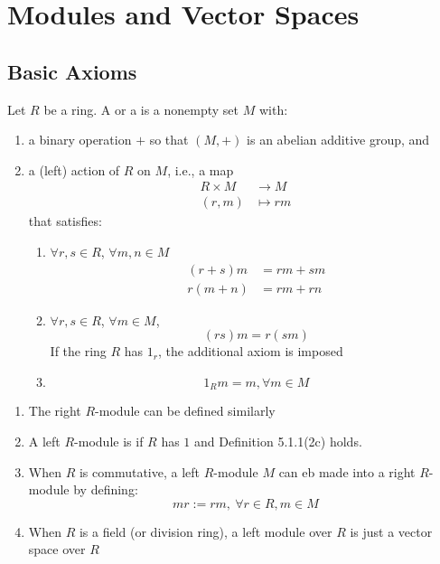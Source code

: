 \section{Modules and Vector Spaces}
\label{sect:modandvec}

\subsection{Basic Axioms}

\begin{definition}
Let $R$ be a ring. A  or a  is a nonempty set $M$ with:
\begin{enumerate}[label=(\roman*)]
\item a binary operation $+$ so that $(M, +)$ is an abelian additive group, and
\item a (left) action of $R$ on $M$, i.e., a map
\begin{align}
R \times M &\rightarrow M \nonumber \\
(r, m) &\mapsto rm \nonumber
\end{align}
that satisfies:
\begin{enumerate}[label=\alph*.]
\item {} $\forall r,s \in R$, $\forall m,n \in M$
\begin{align}
(r+s)m &= rm + sm \nonumber \\
r(m+n) &= rm + rn \nonumber
\end{align}
\item {} $\forall r,s \in R$, $\forall m \in M$,
\begin{equation}
(rs)m = r(sm) \nonumber
\end{equation}
If the ring $R$ has $1_r$, the additional axiom is imposed
\item {}
\begin{equation}
1_R m = m, \forall m \in M \nonumber
\end{equation}
\end{enumerate}
\end{enumerate}
\end{definition}

\begin{remark}
\begin{enumerate}[label=(\roman*)]
\item The right $R$-module can be defined similarly
\item A left $R$-module is  if $R$ has $1$ and Definition 5.1.1(2c) holds.
\item When $R$ is commutative, a left $R$-module $M$ can eb made into a right $R$-module by defining:
\begin{equation}
mr := rm, \ \forall r \in R, m \in M \nonumber
\end{equation} 
\item When $R$ is a field (or division ring), a left module over $R$ is just a vector space over $R$
\end{enumerate}
\end{remark}

